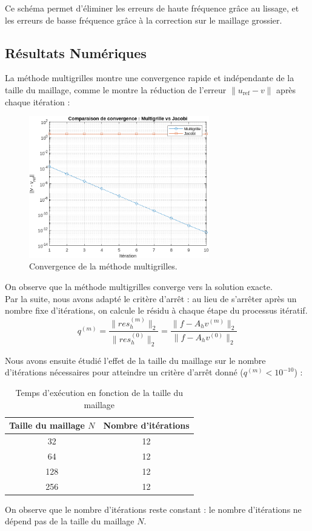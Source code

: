 \documentclass[12pt,a4paper]{article}
\begin{document}
Ce schéma permet d'éliminer les erreurs de haute fréquence grâce au lissage, et les erreurs de basse fréquence grâce à la correction sur le maillage grossier.


\subsection{Résultats Numériques}

La méthode multigrilles montre une convergence rapide et indépendante de la taille du maillage, comme le montre la réduction de l'erreur $\|u_\text{ref} - v\|$ après chaque itération :

\begin{figure}[H]
    \centering
    \includegraphics[width=0.7\textwidth]{src/convergence.png}
    \caption{Convergence de la méthode multigrilles.}
    \label{fig:multigrid_convergence}
\end{figure}

On observe que la méthode multigrilles converge vers la solution exacte. \\

Par la suite, nous avons adapté le critère d'arrêt : au lieu de s'arrêter après un nombre fixe d'itérations, on calcule le résidu à chaque étape du processus itératif.
$$
q^{(m)} = \frac{\|res^{(m)}_h \|_ 2}{\|res^{(0)}_h \|_2} = \frac{\|f - A_h v^{(m)} \|_2}{\|f - A_h v^{(0)} \|_2}
$$

Nous avons ensuite étudié l'effet de la taille du maillage sur le nombre d'itérations nécessaires pour atteindre un critère d'arrêt donné ($q^{(m)} < 10^{-10}$) :

\begin{table}[H]
    \centering
    \begin{tabular}{|c|c|}
        \hline
        \rowcolor{gray!20} \textbf{Taille du maillage $N$} & \textbf{Nombre d'itérations} \\
        \hline
        32 & 12 \\
64 & 12 \\
128 & 12 \\
256 & 12 \\
        \hline
    \end{tabular}
    \caption{Temps d'exécution en fonction de la taille du maillage}
    \label{tab:execution_time}
\end{table}

On observe que le nombre d'itérations reste constant : le nombre d'itérations ne dépend pas de la taille du maillage $N$.
\end{document}
